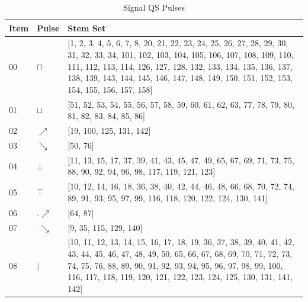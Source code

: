 \documentclass[10pt,journal]{IEEEtran}
\begin{document}
\begin{table}[H] \caption{Signal QS Pulses}\centering\begin{tabular}{|p{.4cm}|p{.5cm}|p{6.5cm}|}\hline Item&Pulse &Stem Set\\ \hline 00& \footnotesize$\sqcap$ & \footnotesize[1, 2, 3, 4, 5, 6, 7, 8, 20, 21, 22, 23, 24, 25, 26, 27, 28, 29, 30, 31, 32, 33, 34, 101, 102, 103, 104, 105, 106, 107, 108, 109, 110, 111, 112, 113, 114, 126, 127, 128, 132, 133, 134, 135, 136, 137, 138, 139, 143, 144, 145, 146, 147, 148, 149, 150, 151, 152, 153, 154, 155, 156, 157, 158]\\ \hline 01& \footnotesize$\sqcup$ & \footnotesize[51, 52, 53, 54, 55, 56, 57, 58, 59, 60, 61, 62, 63, 77, 78, 79, 80, 81, 82, 83, 84, 85, 86]\\ \hline 02& \footnotesize$\nearrow$ & \footnotesize[19, 100, 125, 131, 142]\\ \hline 03& \footnotesize$\searrow$ & \footnotesize[50, 76]\\ \hline 04& \footnotesize$\bot$ & \footnotesize[11, 13, 15, 17, 37, 39, 41, 43, 45, 47, 49, 65, 67, 69, 71, 73, 75, 88, 90, 92, 94, 96, 98, 117, 119, 121, 123]\\ \hline 05& \footnotesize$\top$ & \footnotesize[10, 12, 14, 16, 18, 36, 38, 40, 42, 44, 46, 48, 66, 68, 70, 72, 74, 89, 91, 93, 95, 97, 99, 116, 118, 120, 122, 124, 130, 141]\\ \hline 06& \footnotesize$.\nearrow$ & \footnotesize[64, 87]\\ \hline 07& \footnotesize$^.\searrow$ & \footnotesize[9, 35, 115, 129, 140]\\ \hline 08& \footnotesize$|$ & \footnotesize[10, 11, 12, 13, 14, 15, 16, 17, 18, 19, 36, 37, 38, 39, 40, 41, 42, 43, 44, 45, 46, 47, 48, 49, 50, 65, 66, 67, 68, 69, 70, 71, 72, 73, 74, 75, 76, 88, 89, 90, 91, 92, 93, 94, 95, 96, 97, 98, 99, 100, 116, 117, 118, 119, 120, 121, 122, 123, 124, 125, 130, 131, 141, 142]\\ \hline \end{tabular} \end{table} 
\end{document}
